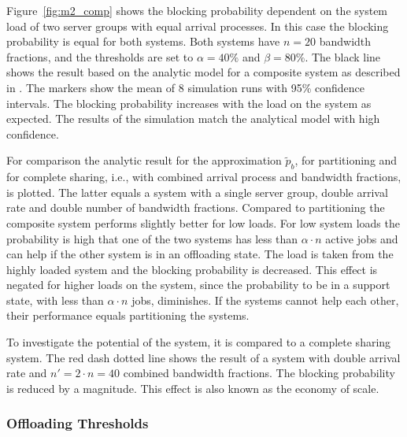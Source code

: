 Figure~\ref{fig:m2_comp} shows the blocking probability dependent on the system load of two server groups with equal arrival processes.
In this case the blocking probability is equal for both systems. Both systems have $n=20$ bandwidth fractions, and the thresholds are set to $\alpha=40\%$ and $\beta=80\%$.
The black line shows the result based on the analytic model for a composite system as described in .
The markers show the mean of 8 simulation runs with 95\% confidence intervals.
The blocking probability increases with the load on the system as expected.
The results of the simulation match the analytical model with high confidence.

For comparison the analytic result for the approximation $\tilde{p}_b$, for partitioning and for complete sharing, i.e., with combined arrival process and bandwidth fractions, is plotted.
The latter equals a system with a single server group, double arrival rate and double number of bandwidth fractions.
Compared to partitioning the composite system performs slightly better for low loads.
For low system loads the probability is high that one of the two systems has less than $\alpha\cdot n$ active jobs and can help if the other system is in an offloading state.
The load is taken from the highly loaded system and the blocking probability is decreased.
This effect is negated for higher loads on the system, since the probability to be in a support state, with less than $\alpha\cdot n$ jobs, diminishes.
If the systems cannot help each other, their performance equals partitioning the systems.

To investigate the potential of the system, it is compared to a complete sharing system.
The red dash dotted line shows the result of a system with double arrival rate and $n'=2\cdot n=40$ combined bandwidth fractions. The blocking probability is reduced by a magnitude. This effect is also known as the economy of scale.


\subsubsection*{Offloading Thresholds}

